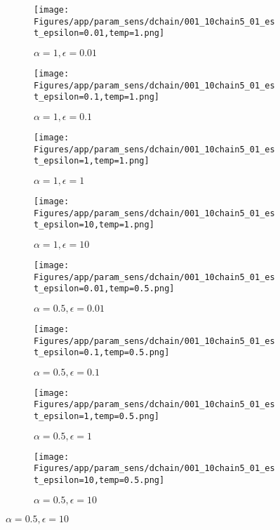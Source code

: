 \documentclass{article}
\theoremstyle{plain}
\begin{document}
\begin{appendices}
\begin{figure}
                \begin{subfigure}[b]{0.24\textwidth}
                    \centering
                    \texttt{[image: Figures/app/param\_sens/dchain/001\_10chain5\_01\_est\_epsilon=0.01,temp=1.png]}
                    \caption*{$\alpha=1,\epsilon=0.01$}
                \end{subfigure}
                \begin{subfigure}[b]{0.24\textwidth}
                    \centering
                    \texttt{[image: Figures/app/param\_sens/dchain/001\_10chain5\_01\_est\_epsilon=0.1,temp=1.png]}
                    \caption*{$\alpha=1,\epsilon=0.1$}
                \end{subfigure}
                \begin{subfigure}[b]{0.24\textwidth}
                    \centering
                    \texttt{[image: Figures/app/param\_sens/dchain/001\_10chain5\_01\_est\_epsilon=1,temp=1.png]}
                    \caption*{$\alpha=1,\epsilon=1$}
                \end{subfigure}
                \begin{subfigure}[b]{0.24\textwidth}
                    \centering
                    \texttt{[image: Figures/app/param\_sens/dchain/001\_10chain5\_01\_est\_epsilon=10,temp=1.png]}
                    \caption*{$\alpha=1,\epsilon=10$}
                \end{subfigure}
                
                \begin{subfigure}[b]{0.24\textwidth}
                    \centering
                    \texttt{[image: Figures/app/param\_sens/dchain/001\_10chain5\_01\_est\_epsilon=0.01,temp=0.5.png]}
                    \caption*{$\alpha=0.5,\epsilon=0.01$}
                \end{subfigure}
                \begin{subfigure}[b]{0.24\textwidth}
                    \centering
                    \texttt{[image: Figures/app/param\_sens/dchain/001\_10chain5\_01\_est\_epsilon=0.1,temp=0.5.png]}
                    \caption*{$\alpha=0.5,\epsilon=0.1$}
                \end{subfigure}
                \begin{subfigure}[b]{0.24\textwidth}
                    \centering
                    \texttt{[image: Figures/app/param\_sens/dchain/001\_10chain5\_01\_est\_epsilon=1,temp=0.5.png]}
                    \caption*{$\alpha=0.5,\epsilon=1$}
                \end{subfigure}
                \begin{subfigure}[b]{0.24\textwidth}
                    \centering
                    \texttt{[image: Figures/app/param\_sens/dchain/001\_10chain5\_01\_est\_epsilon=10,temp=0.5.png]}
                    \caption*{$\alpha=0.5,\epsilon=10$}
                \end{subfigure}
                

\end{figure}
\end{appendices}
\end{document}
